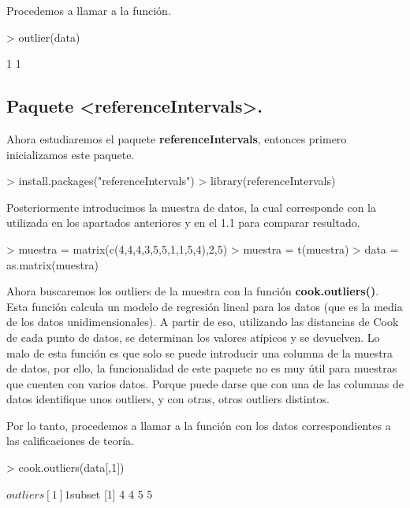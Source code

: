 \documentclass [a4paper] {article}
\begin{document}
\bigskip
Procedemos a llamar a la función.
\begin{Schunk}
\begin{Sinput}
> outlier(data)
\end{Sinput}
\begin{Soutput}
[1] 1 1
\end{Soutput}
\end{Schunk}

\subsection{Paquete <referenceIntervals>.}
\bigskip
Ahora estudiaremos el paquete \textbf{referenceIntervals}, entonces primero inicializamos este paquete.
\begin{Schunk}
\begin{Sinput}
> install.packages("referenceIntervals")
> library(referenceIntervals)
\end{Sinput}
\end{Schunk}

\bigskip
Posteriormente introducimos la muestra de datos, la cual corresponde con la utilizada en los apartados
anteriores y en el 1.1 para comparar resultado.
\begin{Schunk}
\begin{Sinput}
> muestra = matrix(c(4,4,4,3,5,5,1,1,5,4),2,5)
> muestra = t(muestra)
> data = as.matrix(muestra)
\end{Sinput}
\end{Schunk}

\bigskip
Ahora buscaremos los outliers de la muestra con la función \textbf{cook.outliers()}. Esta función calcula
un modelo de regresión lineal para los datos (que es la media de los datos unidimensionales). A partir de eso,
utilizando las distancias de Cook de cada punto de datos, se determinan los valores atípicos y se
devuelven. Lo malo de esta función es que solo se puede introducir una columna de la muestra de datos, por ello,
la funcionalidad de este paquete no es muy útil para muestras que cuenten con varios datos. Porque puede
darse que con una de las columnas de datos identifique unos outliers, y con otras, otros outliers distintos.

\bigskip
Por lo tanto, procedemos a llamar a la función con los datos correspondientes a las calificaciones de teoría.
\begin{Schunk}
\begin{Sinput}
> cook.outliers(data[,1])
\end{Sinput}
\begin{Soutput}
$outliers
[1] 1

$subset
[1] 4 4 5 5
\end{Soutput}
\end{Schunk}
\end{document}
